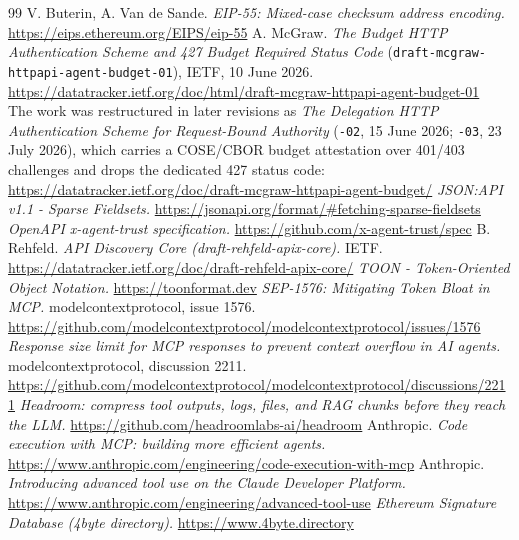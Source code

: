 \documentclass[11pt]{article}
\newcommand{\code}[1]{\texttt{#1}}
\begin{document}
\begin{thebibliography}{99}
\small
{} V. Buterin, A. Van de Sande. \emph{EIP-55: Mixed-case checksum address encoding.} \url{https://eips.ethereum.org/EIPS/eip-55}
 A. McGraw. \emph{The Budget HTTP Authentication Scheme and 427 Budget Required Status Code} (\code{draft-mcgraw-httpapi-agent-budget-01}), IETF, 10 June 2026. \url{https://datatracker.ietf.org/doc/html/draft-mcgraw-httpapi-agent-budget-01} \\ The work was restructured in later revisions as \emph{The Delegation HTTP Authentication Scheme for Request-Bound Authority} (\code{-02}, 15 June 2026; \code{-03}, 23 July 2026), which carries a COSE/CBOR budget attestation over 401/403 challenges and drops the dedicated 427 status code: \url{https://datatracker.ietf.org/doc/draft-mcgraw-httpapi-agent-budget/}
 \emph{JSON:API v1.1 - Sparse Fieldsets.} \url{https://jsonapi.org/format/#fetching-sparse-fieldsets}
 \emph{OpenAPI x-agent-trust specification.} \url{https://github.com/x-agent-trust/spec}
 B. Rehfeld. \emph{API Discovery Core (draft-rehfeld-apix-core).} IETF. \url{https://datatracker.ietf.org/doc/draft-rehfeld-apix-core/}
 \emph{TOON - Token-Oriented Object Notation.} \url{https://toonformat.dev}
 \emph{SEP-1576: Mitigating Token Bloat in MCP.} modelcontextprotocol, issue 1576. \url{https://github.com/modelcontextprotocol/modelcontextprotocol/issues/1576}
 \emph{Response size limit for MCP responses to prevent context overflow in AI agents.} modelcontextprotocol, discussion 2211. \url{https://github.com/modelcontextprotocol/modelcontextprotocol/discussions/2211}
 \emph{Headroom: compress tool outputs, logs, files, and RAG chunks before they reach the LLM.} \url{https://github.com/headroomlabs-ai/headroom}
 Anthropic. \emph{Code execution with MCP: building more efficient agents.} \url{https://www.anthropic.com/engineering/code-execution-with-mcp}
 Anthropic. \emph{Introducing advanced tool use on the Claude Developer Platform.} \url{https://www.anthropic.com/engineering/advanced-tool-use}
 \emph{Ethereum Signature Database (4byte directory).} \url{https://www.4byte.directory}
\end{thebibliography}

\vspace{1em}
\end{document}
